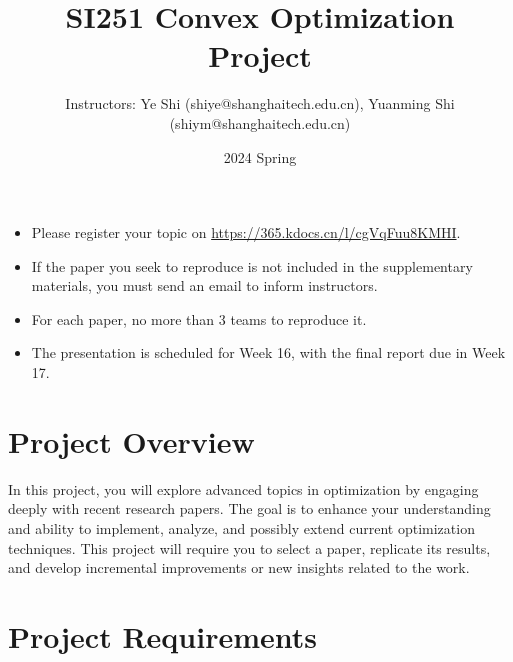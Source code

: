 \documentclass[a4paper, 11pt]{article}
\begin{document}
	\title{SI251 Convex Optimization\\
		Project  } %
	\author{ 
		Instructors: Ye Shi (shiye@shanghaitech.edu.cn), Yuanming Shi (shiym@shanghaitech.edu.cn) } 
	\date{2024 Spring}
	\maketitle
	\begin{tcolorbox}
		\begin{itemize}
			\item Please register your topic on \url{https://365.kdocs.cn/l/cgVqFuu8KMHI}.
			\item If the paper you seek to reproduce is not included in the supplementary materials, you must send an email to inform instructors.
			\item For each paper, no more than 3 teams to reproduce it.
			\item The presentation is scheduled for Week 16, with the final report due in Week 17.
		\end{itemize} 
	\end{tcolorbox}
\section*{Project Overview}

In this project, you will explore advanced topics in optimization by engaging deeply with recent research papers. The goal is to enhance your understanding and ability to implement, analyze, and possibly extend current optimization techniques. This project will require you to select a paper, replicate its results, and develop incremental improvements or new insights related to the work.

\section*{Project Requirements}
\end{document}
